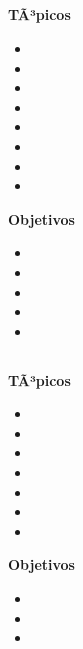 \subsection{\OSSIETEDef }\label{sec:BOK-OS7}

\textbf{TÃ³picos}
\begin{itemize}
	\item \OSSIETETopicVision
	\item \OSSIETETopicPolitica
	\item \OSSIETETopicMetodos
	\item \OSSIETETopicProteccion
	\item \OSSIETETopicModelos
	\item \OSSIETETopicProteccionde
	\item \OSSIETETopicEncriptacion
	\item \OSSIETETopicAdministracion
\end{itemize}

\textbf{Objetivos}
\begin{itemize}
	\item \OSSIETEObjUNO
	\item \OSSIETEObjDOS
	\item \OSSIETEObjTRES
	\item \OSSIETEObjCUATRO
	\item \OSSIETEObjCINCO
\end{itemize}

\subsection{\OSOCHODef }\label{sec:BOK-OS8}

\textbf{TÃ³picos}
\begin{itemize}
	\item \OSOCHOTopicArchivos
	\item \OSOCHOTopicDirectorios
	\item \OSOCHOTopicSistemas
	\item \OSOCHOTopicTecnicas
	\item \OSOCHOTopicArchivosmapeados
	\item \OSOCHOTopicSistemasde
	\item \OSOCHOTopicNombrado
\end{itemize}

\textbf{Objetivos}
\begin{itemize}
	\item \OSOCHOObjUNO
	\item \OSOCHOObjDOS
	\item \OSOCHOObjTRES
\end{itemize}

